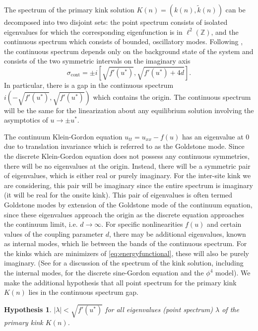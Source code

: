 \documentclass[12pt,reqno]{amsart}
\def\Z{{\mathbb Z}}
\newtheorem{hypothesis}{Hypothesis}
\begin{document}
The spectrum of the primary kink solution $K(n) = (k(n),\tilde{k}(n))$ can be decomposed into two disjoint sets: the point spectrum consists of isolated eigenvalues for which the corresponding eigenfunction is in $\ell^2(\Z)$, and the continuous spectrum which consists of bounded, oscillatory modes. Following \cite{KevrekidisWeinstein2000}, the continuous spectrum depends only on the background state of the system and consists of the two symmetric intervals on the imaginary axis
\begin{equation}\label{eq:contspec}
	\sigma_{\text{cont}} = \pm i \left[\sqrt{f'(u^*)}, \sqrt{f'(u^*) + 4d}\right].
\end{equation}
In particular, there is a gap in the continuous spectrum $i\left(-\sqrt{f'(u^*)},\sqrt{f'(u^*)}\right)$ which contains the origin. The continuous spectrum will be the same for the linearization about any equilibrium solution involving the asymptotics of $u \rightarrow \pm u^*$.

The continuum Klein-Gordon equation $u_{tt} = u_{xx} - f(u)$ has an eigenvalue at 0 due to translation invariance which is referred to as the Goldstone mode. Since the discrete Klein-Gordon equation does not possess any continuous symmetries, there will be no eigenvalues at the origin. Instead, there will be a symmetric pair of eigenvalues, which is either real or purely imaginary. For the inter-site kink we are considering, this pair will be imaginary since the entire spectrum is imaginary (it will be real for the onsite kink). This pair of eigenvalues is often termed Goldstone modes by extension of the Goldstone mode of the continuum equation, since these eigenvalues approach the origin as the discrete equation approaches the continuum limit, i.e. $d \rightarrow \infty$. For specific nonlinearities $f(u)$ and certain values of the coupling parameter $d$, there may be additional eigenvalues, known as internal modes, which lie between the bands of the continuous spectrum. For the kinks which are minimizers of \cref{eq:energyfunctional}, these will also be purely imaginary. (See \cites{cretegny,KevrekidisWeinstein2000} for a discussion of the spectrum of the kink solution, including the internal modes, for the discrete sine-Gordon equation and the $\phi^4$ model). We make the additional hypothesis that all point spectrum for the primary kink $K(n)$ lies in the continuous spectrum gap.

{
\begin{hypothesis}\label{hyp:pointspecgap}
$|\lambda| < \sqrt{f'(u^*)}$ for all eigenvalues (point spectrum) $\lambda$ of the primary kink $K(n)$.
\end{hypothesis}
}
\end{document}
